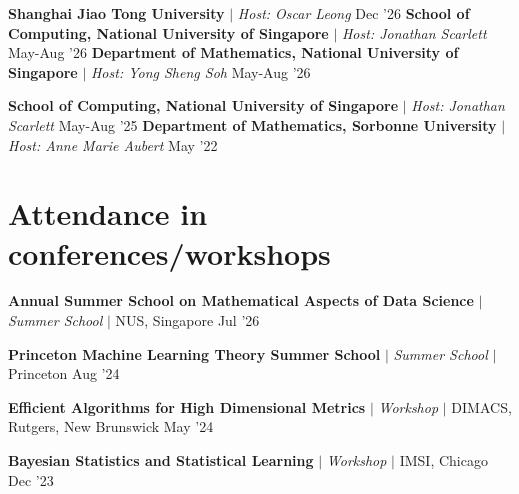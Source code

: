 \resumeProjectHeading
{\textbf{Shanghai Jiao Tong University} $|$ \textit{Host: Oscar Leong}}
{\color{grey}Dec '26}
{}{}
\vspace{\mygap}
\resumeProjectHeading
{\textbf{School of Computing, National University of Singapore} $|$ \textit{Host: Jonathan Scarlett}}
{May-Aug '26}
{}{}
\vspace{\mygap}
\resumeProjectHeading
{\textbf{Department of Mathematics, National University of Singapore} $|$ \textit{Host: Yong Sheng Soh}}
{May-Aug '26}
{}{}

\vspace{\mygap}
\resumeProjectHeading
{\textbf{School of Computing, National University of Singapore} $|$ \textit{Host: Jonathan Scarlett}}
{May-Aug '25}
{}{}
\vspace{\mygap}
\resumeProjectHeading
{\textbf{Department of Mathematics, Sorbonne University} $|$ \textit{Host: Anne Marie Aubert}}
{May '22}
{}
\vspace{\gap}
\resumeSubHeadingListEnd


\section{Attendance in conferences/workshops}
\resumeSubHeadingListStart


\resumeProjectHeading
{\textbf{Annual Summer School on Mathematical Aspects of Data Science} $|$ \textit{Summer School} $|$ NUS, Singapore}
{Jul '26}
{}
\vspace{\mygap}



\resumeProjectHeading
{\textbf{Princeton Machine Learning Theory Summer School} $|$ \textit{Summer School} $|$ Princeton}
{Aug '24}
{}
\vspace{\mygap}

\resumeProjectHeading
{\textbf{Efficient Algorithms for High Dimensional Metrics} $|$ \textit{Workshop} $|$ DIMACS, Rutgers, New Brunswick}
{May '24}
{}
\vspace{\mygap}

\resumeProjectHeading
{\textbf{Bayesian Statistics and Statistical Learning} $|$ \textit{Workshop} $|$ IMSI, Chicago}
{Dec '23}
{}
\vspace{\mygap}

